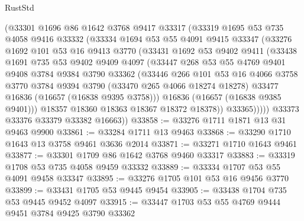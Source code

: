 \begin{lexlean}{RustStd}
\begin{coremodule}
          (@33301
            @1696
            @86
            @1642
            @3768
            @9417
            @33317
            (@33319
              @1695
              @53
              @735
              @4058
              @9416
              @33332
              (@33334
                @1694
                @53
                @55
                @4091
                @9415
                @33347
                (@33276
                  @1692
                  @101
                  @53
                  @16
                  @9413
                  @3770
                  (@33431
                    @1692
                    @53
                    @9402
                    @9411
                    (@33438
                      @1691
                      @735
                      @53
                      @9402
                      @9409
                      @4097
                      (@33447
                        @268
                        @53
                        @55
                        @4769
                        @9401
                        @9408
                        @3784
                        @9384
                        @3790
                        @33362
                        (@33446
                          @266
                          @101
                          @53
                          @16
                          @4066
                          @3758
                          @3770
                          @3784
                          @9394
                          @3790
                          (@33470 @265 @4066 @18274 @18278)
                          @33477
                          @16836
                          (@16657 (@16838 @9395 @3758)))
                        @16836
                        (@16657 (@16838 @9385 @9401)))
                      @18357
                      @18360
                      @18363
                      @18367
                      @18372
                      @18378))
                  @33365)))))
        @33373
        @33376
        @33379
        @33382
        @16663))
@33858 := @33276 @1711 @1871 @13 @31 @9463 @9900
@33861 := @33284 @1711 @13 @9463
@33868 := @33290 @1710 @1643 @13 @3758 @9461 @3636 @2014
@33871 := @33271 @1710 @1643 @9461
@33877 := @33301 @1709 @86 @1642 @3768 @9460 @33317
@33883 := @33319 @1708 @53 @735 @4058 @9459 @33332
@33889 := @33334 @1707 @53 @55 @4091 @9458 @33347
@33895 := @33276 @1705 @101 @53 @16 @9456 @3770
@33899 := @33431 @1705 @53 @9445 @9454
@33905 := @33438 @1704 @735 @53 @9445 @9452 @4097
@33915 := @33447 @1703 @53 @55 @4769 @9444 @9451 @3784 @9425 @3790 @33362

\end{coremodule}
\end{lexlean}
